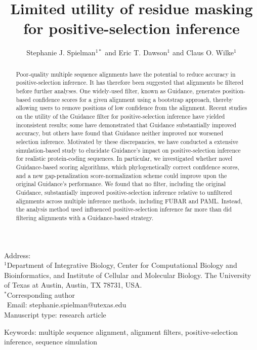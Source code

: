 \documentclass[10pt]{article}
\begin{document}
\title{\textbf{Limited utility of residue masking for positive-selection inference}}
\author{Stephanie J. Spielman$^{1*}$ and Eric T. Dawson$^{1}$ and Claus O. Wilke$^{1}$}
\date{}

\maketitle
\noindent
Address:\\
$^1$Department of Integrative Biology, Center for Computational Biology and Bioinformatics, and Institute of Cellular and Molecular Biology.
The University of Texas at Austin, Austin, TX 78731, USA.\\

\bigskip
\noindent
$^*$Corresponding author\\
$\phantom{^*}$Email: stephanie.spielman@utexas.edu\\

\bigskip
\noindent
Manuscript type: research article

\bigskip
\noindent Keywords: multiple sequence alignment, alignment filters, positive-selection inference, sequence simulation

\newpage
\begin{abstract}
Poor-quality multiple sequence alignments have the potential to reduce accuracy in positive-selection inference. It has therefore been suggested that alignments be filtered before further analyses. One widely-used filter, known as Guidance, generates position-based confidence scores for a given alignment using a bootstrap approach, thereby allowing users to remove positions of low confidence from the alignment. Recent studies on the utility of the Guidance filter for positive-selection inference have yielded inconsistent results; some have demonstrated that Guidance substantially improved accuracy, but others have found that Guidance neither improved nor worsened selection inference. Motivated by these discrepancies, we have conducted a extensive simulation-based study to elucidate Guidance's impact on positive-selection inference for realistic protein-coding sequences. In particular, we investigated whether novel Guidance-based scoring algorithms, which phylogenetically correct confidence scores, and a new gap-penalization score-normalization scheme could improve upon the original Guidance's performance. We found that no filter, including the original Guidance, substantially improved positive-selection inference relative to unfiltered alignments across multiple inference methods, including FUBAR and PAML. Instead, the analysis method used influenced positive-selection inference far more than did filtering alignments with a Guidance-based strategy.
\end{abstract}
\end{document}
